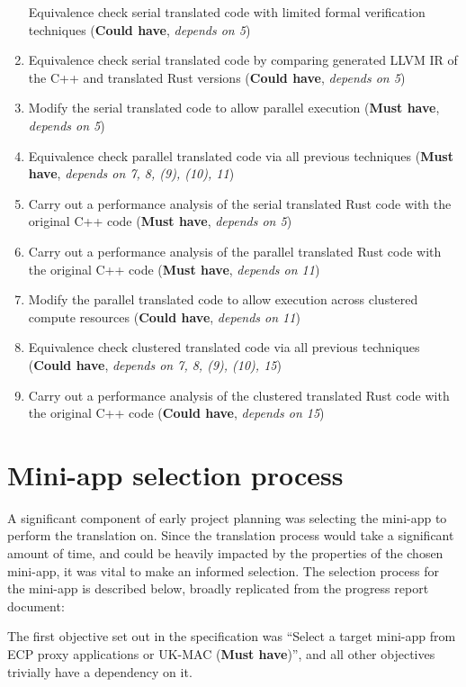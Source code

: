 \begin{enumerate}
  Equivalence check serial translated code with limited formal verification techniques
  (\textbf{Could have}, \textit{depends on 5})
\item
  Equivalence check serial translated code by comparing generated LLVM IR of the C++ and translated Rust versions
  (\textbf{Could have}, \textit{depends on 5})
\item
  Modify the serial translated code to allow parallel execution
  (\textbf{Must have}, \textit{depends on 5})
\item
  Equivalence check parallel translated code via all previous techniques
  (\textbf{Must have}, \textit{depends on 7, 8, (9), (10), 11})
\item
  Carry out a performance analysis of the serial translated Rust code with the original C++ code
  (\textbf{Must have}, \textit{depends on 5})
\item
  Carry out a performance analysis of the parallel translated Rust code with the original C++ code
  (\textbf{Must have}, \textit{depends on 11})
\item
  Modify the parallel translated code to allow execution across clustered compute resources
  (\textbf{Could have}, \textit{depends on 11})
\item
  Equivalence check clustered translated code via all previous techniques
  (\textbf{Could have}, \textit{depends on 7, 8, (9), (10), 15})
\item
  Carry out a performance analysis of the clustered translated Rust code with the original C++ code
  (\textbf{Could have}, \textit{depends on 15})
\end{enumerate}



\section{Mini-app selection process}
\label{sec:miniapp-selection}

A significant component of early project planning was selecting the mini-app to perform the translation on. Since the translation process would take a significant amount of time, and could be heavily impacted by the properties of the chosen mini-app, it was vital to make an informed selection. The selection process for the mini-app is described below, broadly replicated from the progress report document:

The first objective set out in the specification was ``Select a target mini-app from ECP proxy applications or UK-MAC (\textbf{Must have})'', and all other objectives trivially have a dependency on it.

